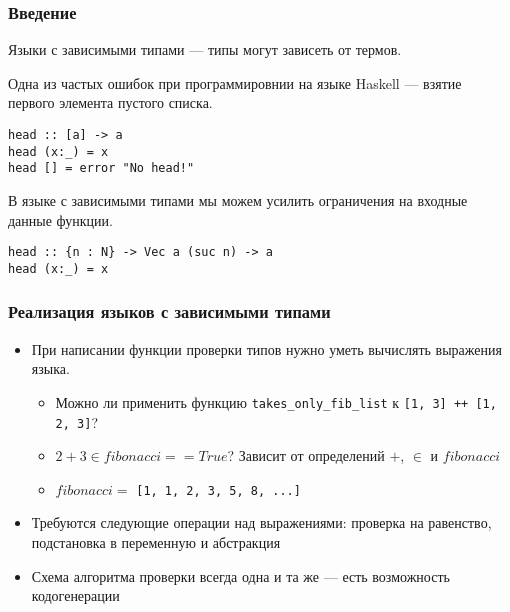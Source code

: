 
\begin{frame}[fragile]
\frametitle{Введение}

Языки с зависимыми типами --- типы могут зависеть от термов.

Одна из частых ошибок при программировнии на языке Haskell --- взятие первого элемента пустого списка.

\begin{verbatim}
head :: [a] -> a
head (x:_) = x
head [] = error "No head!"
\end{verbatim}

В языке с зависимыми типами мы можем усилить ограничения на входные данные функции.

\begin{verbatim}
head :: {n : N} -> Vec a (suc n) -> a
head (x:_) = x
\end{verbatim}

\end{frame}

\begin{frame}
\frametitle{Реализация языков с зависимыми типами}

\begin{itemize}
\item При написании функции проверки типов нужно уметь вычислять выражения языка.
  \begin{itemize}
    \item Можно ли применить функцию \lstinline{takes_only_fib_list} к \lstinline{[1, 3] ++ [1, 2, 3]}?
    \item $2 + 3 \in fibonacci == True$? Зависит от определений $+$, $\in$ и $fibonacci$
    \item $fibonacci =$ \lstinline{[1, 1, 2, 3, 5, 8, ...]}
  \end{itemize}
\item Требуются следующие операции над выражениями: проверка на равенство, подстановка в переменную и абстракция
\item Схема алгоритма проверки всегда одна и та же --- есть возможность кодогенерации

\end{itemize}

\end{frame}

